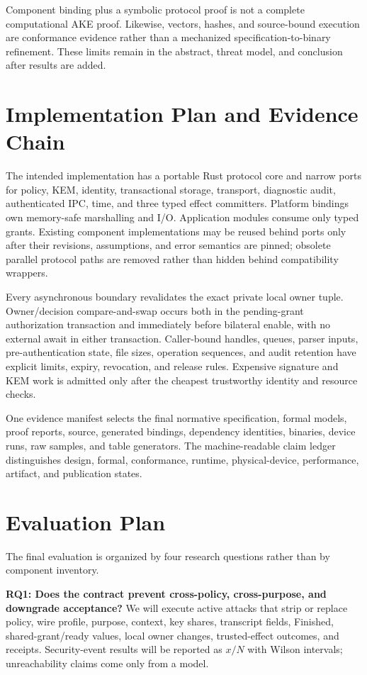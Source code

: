 \documentclass[journal]{IEEEtran}
\begin{document}
Component binding plus a symbolic protocol proof is not a complete computational
AKE proof. Likewise, vectors, hashes, and source-bound execution are conformance
evidence rather than a mechanized specification-to-binary refinement. These
limits remain in the abstract, threat model, and conclusion after results are
added.

\section{Implementation Plan and Evidence Chain}

The intended implementation has a portable Rust protocol core and narrow ports
for policy, KEM, identity, transactional storage, transport, diagnostic audit,
authenticated IPC, time, and three typed effect committers. Platform bindings
own memory-safe marshalling and I/O. Application modules consume only typed
grants. Existing component implementations may be reused behind ports only after
their revisions, assumptions, and error semantics are pinned; obsolete parallel
protocol paths are removed rather than hidden behind compatibility wrappers.

Every asynchronous boundary revalidates the exact private local owner tuple.
Owner/decision compare-and-swap occurs both in the pending-grant authorization
transaction and immediately before bilateral enable, with no external await in
either transaction. Caller-bound handles,
queues, parser inputs, pre-authentication state, file sizes, operation sequences,
and audit retention have explicit limits, expiry, revocation, and release rules.
Expensive signature and KEM work is admitted only after the cheapest trustworthy
identity and resource checks.

One evidence manifest selects the final normative specification, formal models,
proof reports, source, generated bindings, dependency identities, binaries,
device runs, raw samples, and table generators. The machine-readable claim
ledger distinguishes design, formal, conformance, runtime, physical-device,
performance, artifact, and publication states.

\section{Evaluation Plan}

The final evaluation is organized by four research questions rather than by
component inventory.

\textbf{RQ1: Does the contract prevent cross-policy, cross-purpose, and
downgrade acceptance?} We will execute active attacks that strip or replace
policy, wire profile, purpose, context, key shares, transcript fields,
Finished, shared-grant/ready values, local owner changes, trusted-effect outcomes,
and receipts. Security-event results
will be reported as $x/N$ with Wilson intervals; unreachability claims come only
from a model.
\end{document}
